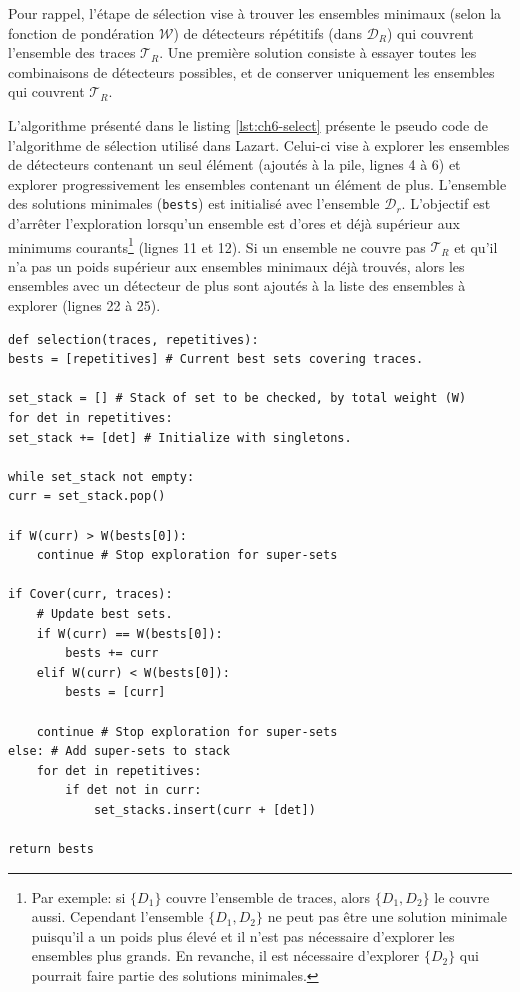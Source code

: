                Pour rappel, l'étape de sélection vise à trouver les ensembles minimaux (selon la fonction de pondération $\mathcal{W}$) de détecteurs répétitifs (dans $\mathcal{D}_R$) qui couvrent l'ensemble des traces $\mathcal{T}_R$. 
               Une première solution consiste à essayer toutes les combinaisons de détecteurs possibles, et de conserver uniquement les ensembles qui couvrent $\mathcal{T}_R$.
               
               L'algorithme présenté dans le listing \ref{lst:ch6-select} présente le pseudo code de l'algorithme de sélection utilisé dans Lazart.
               Celui-ci vise à explorer les ensembles de détecteurs contenant un seul élément (ajoutés à la pile, lignes 4 à 6) et explorer progressivement les ensembles contenant un élément de plus.
               L'ensemble des solutions minimales (\texttt{bests}) est initialisé avec l'ensemble $\mathcal{D}_r$.
               L'objectif est d'arrêter l'exploration lorsqu'un ensemble est d'ores et déjà supérieur aux minimums courants\footnote{Par exemple: si $\{D_{1}\}$ couvre l'ensemble de traces, alors $\{D_{1}, D_2\}$ le couvre aussi. Cependant l'ensemble $\{D_{1}, D_2\}$ ne peut pas être une solution minimale puisqu'il a un poids plus élevé et il n'est pas nécessaire d'explorer les ensembles plus grands. En revanche, il est nécessaire d'explorer $\{D_{2}\}$ qui pourrait faire partie des solutions minimales.} (lignes 11 et 12).
               Si un ensemble ne couvre pas $\mathcal{T}_R$ et qu'il n'a pas un poids supérieur aux ensembles minimaux déjà trouvés, alors les ensembles avec un détecteur de plus sont ajoutés à la liste des ensembles à explorer (lignes 22 à 25).

\begin{lstlisting}
def selection(traces, repetitives):
bests = [repetitives] # Current best sets covering traces.

set_stack = [] # Stack of set to be checked, by total weight (W)
for det in repetitives: 
set_stack += [det] # Initialize with singletons.

while set_stack not empty:
curr = set_stack.pop()

if W(curr) > W(bests[0]):  
    continue # Stop exploration for super-sets

if Cover(curr, traces): 
    # Update best sets.
    if W(curr) == W(bests[0]):
        bests += curr
    elif W(curr) < W(bests[0]):
        bests = [curr]
        
    continue # Stop exploration for super-sets
else: # Add super-sets to stack
    for det in repetitives:
        if det not in curr:
            set_stacks.insert(curr + [det])

return bests
\end{lstlisting} 
           
